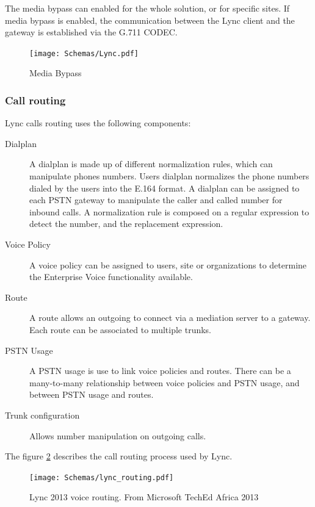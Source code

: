 The media bypass can enabled for the whole solution, or for specific sites. If media bypass is enabled, the communication between the Lync client and the gateway is established via the G.711 CODEC.

\begin{figure}[H]
	\centering
	\texttt{[image: Schemas/Lync.pdf]}
	\caption{Media Bypass}
	\label{fig:lync_mediabypass}
\end{figure}

\subsubsection{Call routing}
Lync calls routing uses the following components\cite{microsoft_technet_dial_2012}:

\begin{description}
\item[Dialplan] A dialplan is made up of different normalization rules, which can manipulate phones numbers. Users dialplan normalizes the phone numbers dialed by the users into the E.164 format. A dialplan can be assigned to each PSTN gateway to manipulate the caller and called number for inbound calls. A normalization rule is composed on a regular expression to detect the number, and the replacement expression.

\item[Voice Policy] A voice policy can be assigned to users, site or organizations to determine the Enterprise Voice functionality available.

\item[Route] A route allows an outgoing to connect via a mediation server to a gateway. Each route can be associated to multiple trunks.

\item[PSTN Usage] A PSTN usage is use to link voice policies and routes. There can be a many-to-many relationship between voice policies and PSTN usage, and between PSTN usage and routes.

\item[Trunk configuration] Allows number manipulation on outgoing calls.
\end{description}

The figure \ref{fig:lync_routing} describes the call routing process used by Lync.

\begin{figure}[H]
	\centering
	\texttt{[image: Schemas/lync\_routing.pdf]}
	\caption[Lync 2013 voice routing]{Lync 2013 voice routing. From Microsoft TechEd Africa 2013}
	\label{fig:lync_routing}
\end{figure}




